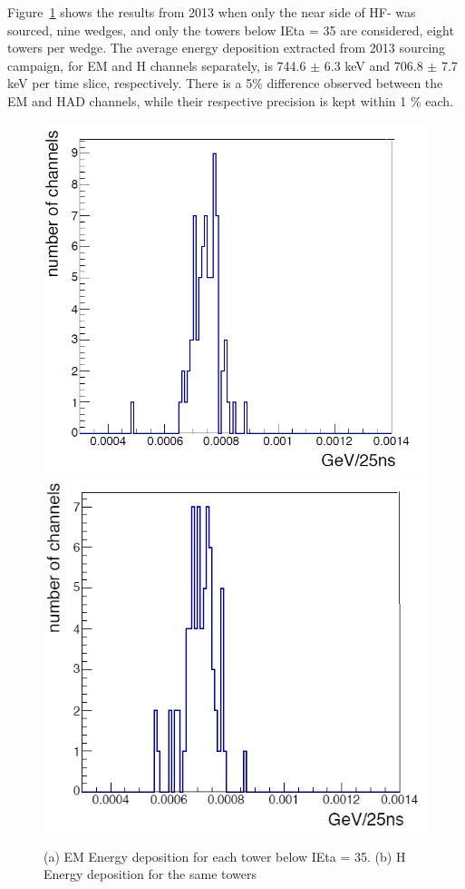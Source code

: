 Figure~\ref{fig:HFM_2013_Res} shows the results from 2013 when only the near side
of HF- was sourced, nine wedges, and only the towers below IEta = 35 are
considered, eight towers per wedge. The average energy deposition extracted from
2013 sourcing campaign, for EM and H channels separately, is 744.6 $\pm$ 6.3 keV and 706.8 $\pm$ 7.7 keV per time slice, respectively. There is a 5\% difference observed between the EM and HAD channels, while their
respective precision is kept within 1 \% each.
\begin{figure}[htb]
   \begin{center}
      \includegraphics[width=.45\textwidth]{figures/ch_hfcalibration/HFM_2013_Res_EM.png}
      \includegraphics[width=.45\textwidth]{figures/ch_hfcalibration/HFM_2013_Res_H.png}
      \caption{(a) EM Energy deposition for each tower below IEta = 35. (b) H Energy deposition for the same towers}
      \label{fig:HFM_2013_Res}
   \end{center}
\end{figure}

